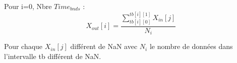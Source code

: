 Pour  i=$0$, Nbre $Time_{bnds}$ :
\[
X_{out}[i] = \frac{
\displaystyle{\sum_{tb[i][0]}^{tb[i][1]} X_{in}[j]} }
{N_{i}} 
\]
 
Pour chaque $X_{in}[j]$ diff\'{e}rent de NaN avec $N_i$ le nombre de donn\'ees dans l'intervalle tb  diff\'erent de NaN.
